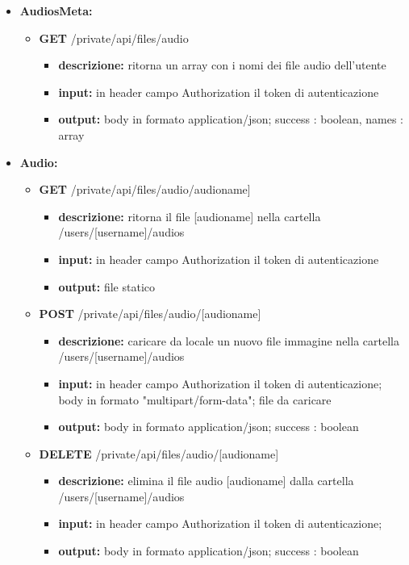 {{\begin{itemize}
		\item \textbf{AudiosMeta:}
			\begin{itemize}
			\item   \textbf{GET} /private/api/files/audio
				\begin{itemize} 
				\item \textbf{descrizione:} ritorna un array con i nomi dei file audio dell'utente
				\item \textbf{input:} in header campo Authorization il token di autenticazione
				\item \textbf{output:} body in formato application/json; success : boolean, names : array
				\end{itemize}
			\end{itemize}
			
		\item \textbf{Audio:}
			\begin{itemize}
			\item    \textbf{GET} /private/api/files/audio/audioname]
				\begin{itemize} 
				\item \textbf{descrizione:} ritorna il file [audioname] nella cartella /users/[username]/audios					
				\item \textbf{input:} in header campo Authorization il token di autenticazione
				\item \textbf{output:} file statico
				\end{itemize}
			\item    \textbf{POST} /private/api/files/audio/[audioname]
				\begin{itemize} 
				\item \textbf{descrizione:} caricare da locale un nuovo file immagine nella cartella /users/[username]/audios					
				\item \textbf{input:} in header campo Authorization il token di autenticazione; body in formato "multipart/form-data"; file da caricare
				\item \textbf{output:} body in formato application/json; success : boolean
				\end{itemize}
			\item   \textbf{DELETE} /private/api/files/audio/[audioname]
				\begin{itemize} 
				\item \textbf{descrizione:} elimina il file audio [audioname] dalla cartella /users/[username]/audios			
				\item \textbf{input:} in header campo Authorization il token di autenticazione;
				\item \textbf{output:} body in formato application/json; success : boolean
				\end{itemize}
			\end{itemize}
			

\end{itemize}}}
